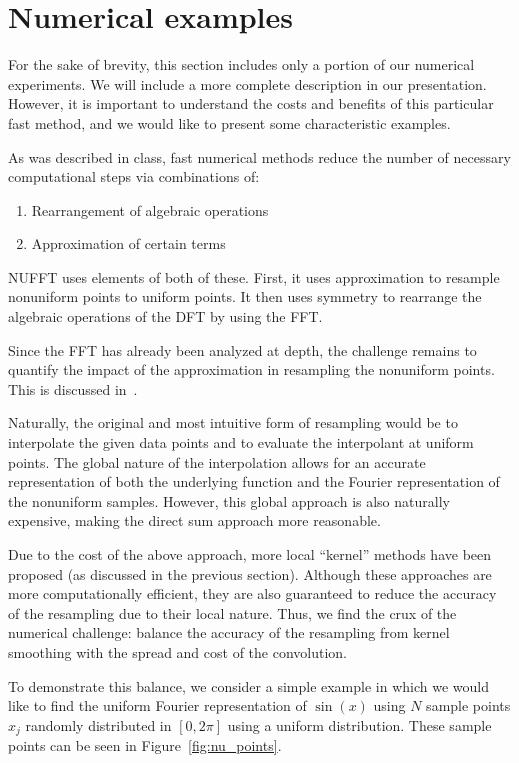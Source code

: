 \section{Numerical examples}

For the sake of brevity, this section includes only a portion of our numerical experiments.
We will include a more complete description in our presentation.
However, it is important to understand the costs and benefits of this particular fast method, and we would like to present some characteristic examples.

As was described in class, fast numerical methods reduce the number of necessary computational steps via combinations of:
\begin{enumerate}
    \item Rearrangement of algebraic operations
    \item Approximation of certain terms
\end{enumerate}
NUFFT uses elements of both of these.
First, it uses approximation to resample nonuniform points to uniform points.
It then uses symmetry to rearrange the algebraic operations of the DFT by using the FFT.

Since the FFT has already been analyzed at depth, the challenge remains to quantify the impact of the approximation in resampling the nonuniform points.
This is discussed in~\cite{SISC-1993-Dutt-Rokhlin}. %

Naturally, the original and most intuitive form of resampling would be to interpolate the given data points and to evaluate the interpolant at uniform points.
The global nature of the interpolation allows for an accurate representation of both the underlying function and the Fourier representation of the nonuniform samples.
However, this global approach is also naturally expensive, making the direct sum approach more reasonable. %

Due to the cost of the above approach, more local ``kernel'' methods have been proposed (as discussed in the previous section).
Although these approaches are more computationally efficient, they are also guaranteed to reduce the accuracy of the resampling due to their local nature.
Thus, we find the crux of the numerical challenge: balance the accuracy of the resampling from kernel smoothing with the spread and cost of the convolution.

To demonstrate this balance, we consider a simple example in which we would like to find the uniform Fourier representation of $\sin{(x)} $ using $N$ sample points $x_j$ randomly distributed in $[0, 2\pi]$ using a uniform distribution.
These sample points can be seen in Figure~\ref{fig:nu_points}.

